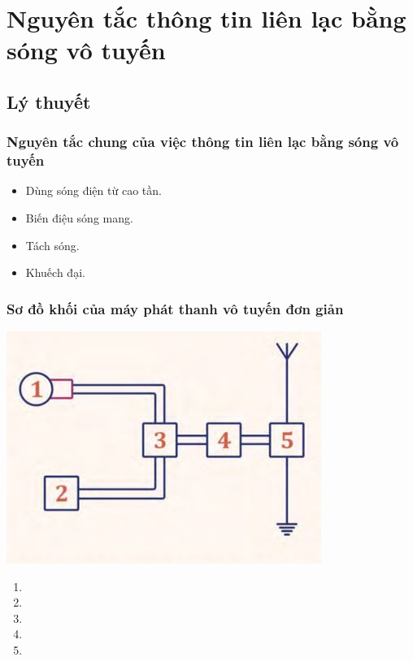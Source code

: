 
\chapter[Nguyên tắc thông tin liên lạc\\ bằng sóng vô tuyến]{Nguyên tắc thông tin liên lạc bằng sóng vô tuyến}
\section{Lý thuyết}
\subsection {Nguyên tắc chung của việc thông tin liên lạc bằng sóng vô tuyến}
\begin{itemize}
	\item Dùng sóng điện từ cao tần.
	\item Biến điệu sóng mang.
	\item Tách sóng.
	\item Khuếch đại.
\end{itemize}
\subsection {Sơ đồ khối của máy phát thanh vô tuyến đơn giản}
\begin{center}
	\includegraphics[scale=0.5]{../figs/4-4-1.JPG}
\end{center}
\begin{enumerate}
	\item {}
	\item {}
	\item {}
	\item {}
	\item  {}
\end{enumerate}
